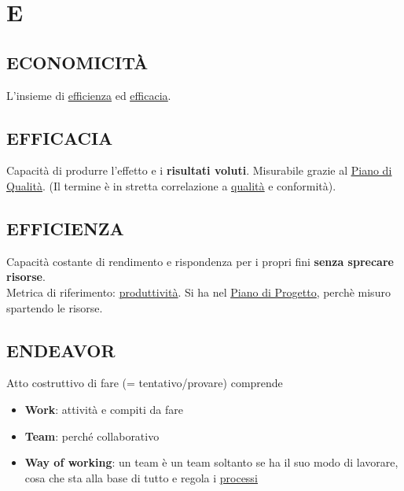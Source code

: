 \newpage
	\section{E} \label{sec:E}

		\subsection{ECONOMICITÀ}  \label{economicita}
		L'insieme di \underline{\hyperref[efficienza]{efficienza}} ed \underline{\hyperref[efficacia]{efficacia}}.

		\subsection{EFFICACIA}  \label{efficacia}
		Capacità di produrre l'effetto e i \textbf{risultati voluti}. Misurabile grazie al \underline{\hyperref[pianoqualita]{Piano di Qualità}}. (Il termine è in stretta correlazione a \underline{\hyperref[qualita]{qualità}} e conformità).


		\subsection{EFFICIENZA}  \label{efficienza}
		Capacità costante di rendimento e rispondenza per i propri fini \textbf{senza sprecare risorse}. \\
		Metrica di riferimento: \underline{\hyperref[produttivita]{produttività}}.
		Si ha nel \underline{\hyperref[piano]{Piano di Progetto}}, perchè misuro spartendo le risorse.

		\subsection{ENDEAVOR}  \label{endeavor}
		Atto costruttivo di fare (= tentativo/provare) comprende
		\begin{itemize}
			\item \textbf{Work}: attività e compiti da fare \label{work}
			\item \textbf{Team}: perché collaborativo \label{team}
			\item \textbf{Way of working}: un team è un team soltanto se ha il suo modo di lavorare, cosa che sta alla base di tutto e regola i \underline{\hyperref[processo]{processi}} \label{way}
		\end{itemize}


